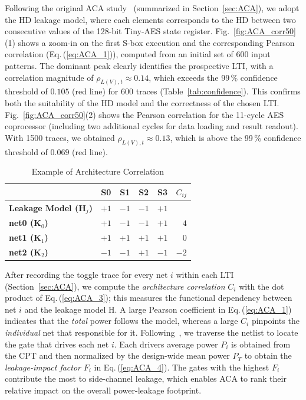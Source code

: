 \documentclass[sigconf]{acmart}
\begin{document}
Following the original ACA study~\cite{ACA} (summarized in Section~\ref{sec:ACA}), we adopt the HD leakage model, where each elements corresponds to the HD between two consecutive values of the 128-bit Tiny-AES state register. Fig.~\ref{fig:ACA_corr50}(1) shows a zoom-in on the first S-box execution and the corresponding Pearson correlation (Eq.\,(\ref{eq:ACA_1})), computed from an initial set of 600 input patterns. The dominant peak clearly identifies the prospective LTI, with a correlation magnitude of \(\rho_{L(V),t}\approx 0.14\), which exceeds the 99\,\% confidence threshold of \(0.105\) (red line) for 600 traces (Table~\ref{tab:confidence}). This confirms both the suitability of the HD model and the correctness of the chosen LTI.  Fig.~\ref{fig:ACA_corr50}(2) shows the Pearson correlation for the 11-cycle AES coprocessor (including two additional cycles for data loading and result readout). With 1500 traces, we obtained \(\rho_{L(V),t}\approx 0.13\), which is above the 99\,\% confidence threshold of \(0.069\) (red line).
\begin{table}[t]
\centering
\caption{Example of Architecture Correlation}
\label{tab:example_AC}
\begin{tabular}{@{}lccccr@{}}
\toprule
 & S0 & S1 & S2 & S3 & $C_{ij}$ \\
\midrule
\textbf{Leakage Model (H$_j$)} & $+1$ & $-1$ & $-1$ & $+1$ & \\
\textbf{net0 (K$_0$)} & $+1$ & $-1$ & $-1$ & $+1$ & $4$ \\
\textbf{net1 (K$_1$)} & $+1$ & $+1$ & $+1$ & $+1$ & $0$ \\
\textbf{net2 (K$_2$)} & $-1$ & $-1$ & $+1$ & $-1$ & $-2$ \\
\bottomrule
\end{tabular}
\end{table}
 After recording the toggle trace for every net \(i\) within each LTI
(Section~\ref{sec:ACA}), we compute the \emph{architecture correlation}
\(C_i\) with the dot product of Eq.\,(\ref{eq:ACA_3}); this measures the
functional dependency between net \(i\) and the leakage model H.
A large Pearson coefficient in Eq.\,(\ref{eq:ACA_1}) indicates that the
\emph{total} power follows the model, whereas a large \(C_i\) pinpoints
the \emph{individual} net that responsible for it.
Following~\cite{ACA}, we traverse the netlist to locate the gate that
drives each net \(i\). Each drivers average power \(P_i\) is obtained from 
the CPT and then normalized by the design-wide mean power
\(P_T\) to obtain the \emph{leakage-impact factor} \(F_i\) in Eq.\,(\ref{eq:ACA_4}). 
The gates with the highest \(F_i\) contribute the most to side-channel leakage, 
which enables ACA to rank their relative impact on the overall power-leakage footprint.
\end{document}
